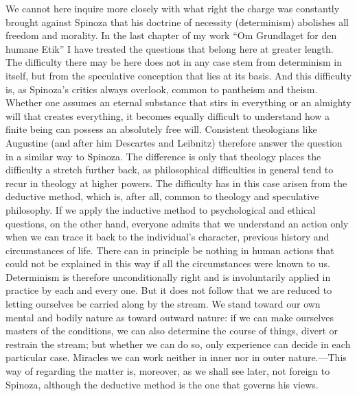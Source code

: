 \documentclass[12pt]{book}
\newcommand{\opage}[1]{\marginnote{\footnotesize\textit{[#1]}}}
\begin{document}
We cannot here inquire more closely with what right the charge was constantly brought
against Spinoza \opage{53}that his doctrine of necessity (determinism) abolishes all
freedom and morality. In the last chapter of my work ``Om Grundlaget for den humane
Etik'' I have treated the questions that belong here at greater length. The difficulty
there may be here does not in any case stem from determinism in itself, but from the
speculative conception that lies at its basis. And this difficulty is, as Spinoza's
critics always overlook, common to pantheism and theism. Whether one assumes an eternal
substance that stirs in everything or an almighty will that creates everything, it
becomes equally difficult to understand how a finite being can possess an absolutely
free will. Consistent theologians like Augustine (and after him Descartes and Leibnitz)
therefore answer the question in a similar way to Spinoza. The difference is only that
theology places the difficulty a stretch further back, as philosophical difficulties
in general tend to recur in theology at higher powers. The difficulty has in this case
arisen from the deductive method, which is, after all, common to theology and
speculative philosophy. If we apply the inductive method to psychological and ethical
questions, on the other hand, everyone admits that we understand an action only when we
can trace it back to the individual's character, previous history and circumstances of
life. There can in principle be nothing in human actions that could not be explained in
this way if all the circumstances were known to us. Determinism is therefore
unconditionally right and is involuntarily applied in practice by each and every one.
But it does not follow that we are reduced to letting ourselves be carried along by the
stream. We \opage{54}stand toward our own mental and bodily nature as toward outward
nature: if we can make ourselves masters of the conditions, we can also determine the
course of things, divert or restrain the stream; but whether we can do so, only
experience can decide in each particular case. Miracles we can work neither in inner
nor in outer nature.---This way of regarding the matter is, moreover, as we shall see
later, not foreign to Spinoza, although the deductive method is the one that governs his
views.
\end{document}
